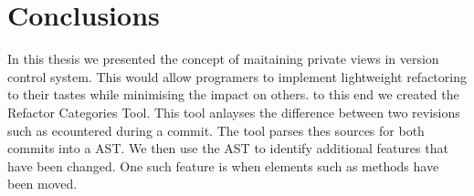 
\chapter{Conclusions}\label{C:con}

In this thesis we presented the concept of maitaining private views in version control system. This would allow programers to implement lightweight refactoring to their tastes while minimising the impact on others.  to this end we created the Refactor Categories Tool. This tool anlayses the difference between two revisions such as ecountered during a commit.  The tool parses thes sources for both commits into a AST. We then use the AST to identify additional features that have been changed.  One such feature is when elements such as methods have been moved. 
